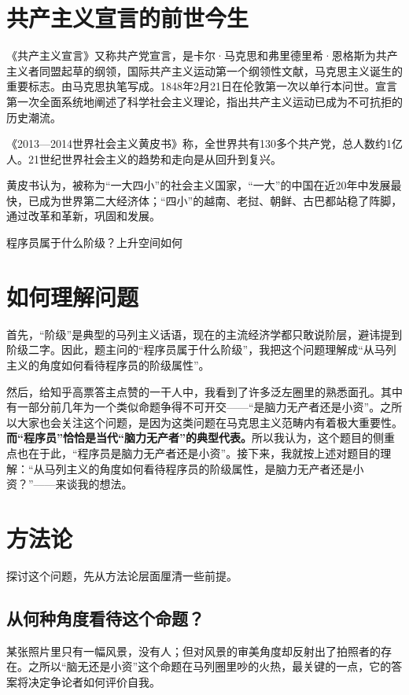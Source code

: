 \documentclass[punct=kaiming, zihao=5, openany, fontset=sikou]{ctexbook}
\begin{document}
\section*{共产主义宣言的前世今生}
\begin{note}
  《共产主义宣言》又称共产党宣言，是卡尔·马克思和弗里德里希·恩格斯为共产主义者同盟起草的纲领，国际共产主义运动第一个纲领性文献，马克思主义诞生的重要标志。由马克思执笔写成。1848年2月21日在伦敦第一次以单行本问世。宣言第一次全面系统地阐述了科学社会主义理论，指出共产主义运动已成为不可抗拒的历史潮流。

  《2013—2014世界社会主义黄皮书》称，全世界共有130多个共产党，总人数约1亿人。21世纪世界社会主义的趋势和走向是从回升到复兴。

  黄皮书认为，被称为“一大四小”的社会主义国家，“一大”的中国在近20年中发展最快，已成为世界第二大经济体；“四小”的越南、老挝、朝鲜、古巴都站稳了阵脚，通过改革和革新，巩固和发展。
\end{note}

\begin{warning}
  程序员属于什么阶级？上升空间如何
\end{warning}

\section{如何理解问题}
首先，“阶级”是典型的马列主义话语，现在的主流经济学都只敢说阶层，避讳提到阶级二字。因此，题主问的“程序员属于什么阶级”，我把这个问题理解成“从马列主义的角度如何看待程序员的阶级属性”。

然后，给知乎高票答主点赞的一干人中，我看到了许多泛左圈里的熟悉面孔。其中有一部分前几年为一个类似命题争得不可开交——“是脑力无产者还是小资”。之所以大家也会关注这个问题，是因为这类问题在马克思主义范畴内有着极大重要性。{\bfseries 而“程序员”恰恰是当代“脑力无产者”的典型代表。}所以我认为，这个题目的侧重点也在于此，“程序员是脑力无产者还是小资”。接下来，我就按上述对题目的理解：“从马列主义的角度如何看待程序员的阶级属性，是脑力无产者还是小资？”——来谈我的想法。

\section{方法论}
\begin{note}
  探讨这个问题，先从方法论层面厘清一些前提。
\end{note}

\subsection{从何种角度看待这个命题？}
某张照片里只有一幅风景，没有人；但对风景的审美角度却反射出了拍照者的存在。之所以“脑无还是小资”这个命题在马列圈里吵的火热，最关键的一点，它的答案将决定争论者如何评价自我。
\end{document}
